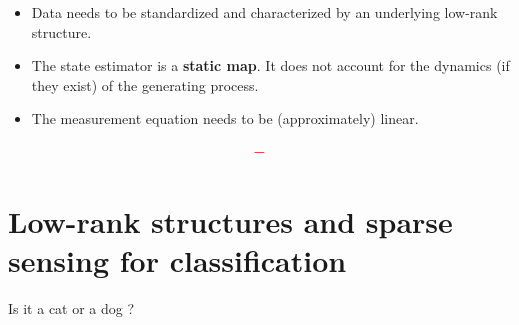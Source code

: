 \documentclass[aspectratio=169, usenames, dvipsnames]{beamer}
\begin{document}
\begin{frame}
  \vfill

  \begin{minipage}{.68\textwidth}
    \begin{itemize}
      \item Data needs to be standardized and characterized by an underlying low-rank structure.

      \bigskip

      \item The state estimator is a \textbf{static map}.
      It does not account for the dynamics (if they exist) of the generating process.

      \bigskip

      \item The measurement equation needs to be (approximately) linear.

    \end{itemize}
  \end{minipage}%
  \hfill
  \begin{minipage}{.28\textwidth}
    \centering
    \Huge
    \[
    \color{red} \bm{-}
    \]
  \end{minipage}

  \vfill
\end{frame}

\section{Low-rank structures and sparse sensing for classification}
\begin{frame}
  \sectionpage
\end{frame}

\begin{frame}
  \vfill
  \begin{minipage}{.58\textwidth}
    \centering
    Is it a cat or a dog ?
  \end{minipage}%
  \hfill
  \begin{minipage}{.38\textwidth}

  \end{minipage}
  \vfill
\end{frame}

{

\begin{frame}

\end{frame}
}
\end{document}

